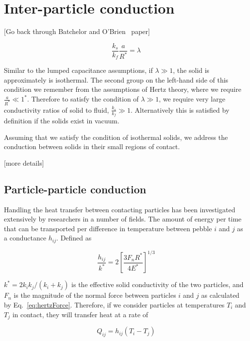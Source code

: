 \section{Inter-particle conduction}\label{sec:particle-conduction}
[Go back through Batchelor and O'Brien~\cite{Batchelor1977} paper]

\begin{equation}
	\frac{ k_s }{ k_f } \frac{a}{R^*} = \lambda
\end{equation}

Similar to the lumped capacitance assumptions, if $\lambda \gg 1$, the solid is approximately is isothermal. The second group on the left-hand side of this condition we remember from the assumptions of Hertz theory, where we require $\frac{a}{R^*} \ll 1^*$. Therefore to satisfy the condition of $\lambda \gg 1$, we require very large conductivity ratios of solid to fluid, $\frac{k_s}{k_f} \gg 1$. Alternatively this is satisfied by definition if the solids exist in vacuum.

Assuming that we satisfy the condition of isothermal solids, we address the conduction between solids in their small regions of contact.

[more details]










\subsection{Particle-particle conduction}

Handling the heat transfer between contacting particles has been investigated extensively by researchers in a number of fields\cite{Zhou2009,Zhang2011,Wu2011,Vargas2001,Li2000,Chaudhuri2006}. The amount of energy per time that can be transported per difference in temperature between pebble $i$ and $j$ as a conductance $h_{ij}$. Defined as

\begin{equation}\label{eq:pebble-conductance}
	\frac{h_{ij}}{k^*}= 2\left[\frac{3F_nR^*}{4E^*}\right]^{1/3}
\end{equation}

$k^*= 2k_ik_j/(k_i+k_j)$ is the effective solid conductivity of the two particles, and $F_n$ is the magnitude of the normal force between particles $i$ and $j$ as calculated by Eq.~\ref{eq:hertzForce}. Therefore, if we consider particles at temperatures $T_i$ and $T_j$ in contact, they will transfer heat at a rate of

\begin{equation}
	Q_{ij} = h_{ij}(T_i - T_j)
\end{equation} 

